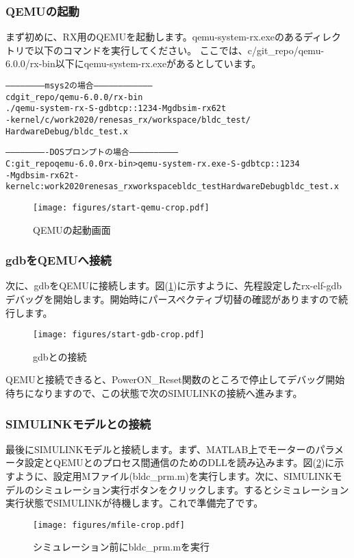 \subsubsection{QEMUの起動}
まず初めに、RX用のQEMUを起動します。qemu-system-rx.exeのあるディレクトリで以下のコマンドを実行してください。
ここでは、c/git\_repo/qemu-6.0.0/rx-bin以下にqemu-system-rx.exeがあるとしています。
{\small
\begin{alltt}
    ------------------------msys2の場合-----------------------------------
    cd git\_repo/qemu-6.0.0/rx-bin
    ./qemu-system-rx -S -gdb tcp::1234 -M gdbsim-rx62t
     -kernel /c/work2020/renesas\_rx/workspace/bldc\_test/
    HardwareDebug/bldc\_test.x

    -------------------------DOSプロンプトの場合------------------------------
    C:{\yen}git\_repo{\yen}qemu-6.0.0{\yen}rx-bin>qemu-system-rx.exe -S -gdb tcp::1234
     -M gdbsim-rx62t -kernel c:{\yen}work2020{\yen}renesas\_rx{\yen}workspace{\yen}bldc\_test{\yen}HardwareDebug{\yen}bldc\_test.x
\end{alltt}
}
\begin{figure}[htbp!]
    \begin{center}
    \texttt{[image: figures/start-qemu-crop.pdf]}
    \end{center}
\caption{QEMUの起動画面}
\end{figure}
\newpage

\subsubsection{gdbをQEMUへ接続}
次に、gdbをQEMUに接続します。図(\ref{start-gdb})に示すように、先程設定したrx-elf-gdbデバッグを開始します。開始時にパースペクティブ切替の確認がありますので続行します。
\begin{figure}[htbp!]
    \begin{center}
        \texttt{[image: figures/start-gdb-crop.pdf]}
    \end{center}
    \caption{gdbとの接続}
    \label{start-gdb}
\end{figure}
QEMUと接続できると、PowerON\_Reset関数のところで停止してデバッグ開始待ちになりますので、この状態で次のSIMULINKの接続へ進みます。

\subsubsection{SIMULINKモデルとの接続}
最後にSIMULINKモデルと接続します。まず、MATLAB上でモーターのパラメータ設定とQEMUとのプロセス間通信のためのDLLを読み込みます。図(\ref{mfile})に示すように、設定用Mファイル(bldc\_prm.m)を実行します。次に、SIMULINKモデルのシミュレーション実行ボタンをクリックします。するとシミュレーション実行状態でSIMULINKが待機します。これで準備完了です。
\begin{figure}[htbp!]
    \begin{center}
        \texttt{[image: figures/mfile-crop.pdf]}
    \end{center}
    \caption{シミュレーション前にbldc\_prm.mを実行}
    \label{mfile}
\end{figure}

